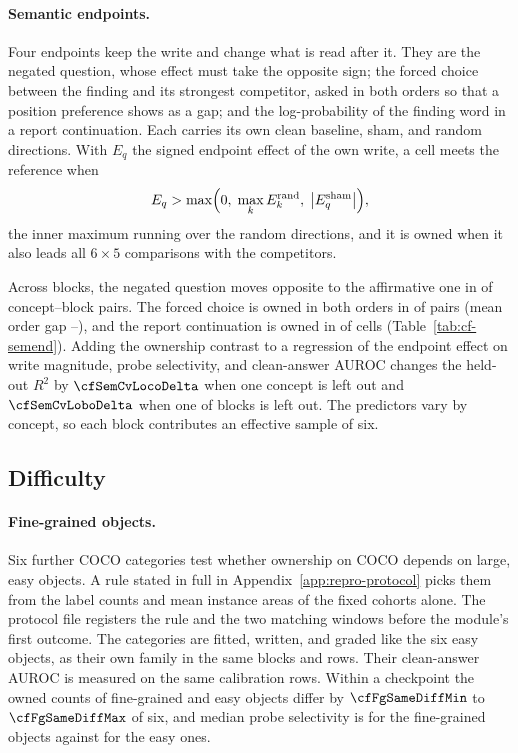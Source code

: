 \paragraph{Semantic endpoints.} Four endpoints keep the write and change what is read after it. They are the negated question, whose effect must take the opposite sign; the forced choice between the finding and its strongest competitor, asked in both orders so that a position preference shows as a gap; and the log-probability of the finding word in a report continuation. Each carries its own clean baseline, sham, and \cfSemLedgerRandom{} random directions. With $E_q$ the signed endpoint effect of the own write, a cell meets the reference when
\begin{equation}
E_q>\max\Bigl(0,\;\max_{k}E^{\mathrm{rand}}_{k},\;\bigl|E^{\mathrm{sham}}_q\bigr|\Bigr),
\label{eq:endpoint-reference}
\end{equation}
the inner maximum running over the \cfSemLedgerRandom{} random directions, and it is owned when it also leads all $6\times5$ comparisons with the competitors.

Across \cfSemBlocks{} blocks, the negated question moves opposite to the affirmative one in \cfSemNegOpposite{} of \cfSemNegN{} concept--block pairs. The forced choice is owned in both orders in \cfSemForcedOwned{} of \cfSemForcedN{} pairs (mean order gap \cfSemGapMin{}--\cfSemGapMax{}), and the report continuation is owned in \cfSemReportOwned{} of \cfSemReportCells{} cells (Table~\ref{tab:cf-semend}). Adding the ownership contrast to a regression of the endpoint effect on write magnitude, probe selectivity, and clean-answer AUROC changes the held-out $R^2$ by $\cfSemCvLocoDelta$ when one concept is left out and $\cfSemCvLoboDelta$ when one of \cfSemCvBlocks{} blocks is left out. The predictors vary by concept, so each block contributes an effective sample of six.



\subsection{Difficulty}
\label{app:cf-difficulty}

\paragraph{Fine-grained objects.} Six further COCO categories test whether ownership on COCO depends on large, easy objects. A rule stated in full in Appendix~\ref{app:repro-protocol} picks them from the label counts and mean instance areas of the fixed cohorts alone. The protocol file registers the rule and the two matching windows before the module's first outcome. The categories are fitted, written, and graded like the six easy objects, as their own family in the same blocks and rows. Their clean-answer AUROC is measured on the same calibration rows. Within a checkpoint the owned counts of fine-grained and easy objects differ by $\cfFgSameDiffMin$ to $\cfFgSameDiffMax$ of six, and median probe selectivity is \cfFgFineSel{} for the fine-grained objects against \cfFgEasySameSel{} for the easy ones.

